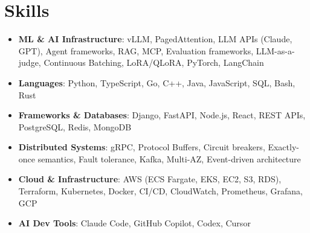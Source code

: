 \documentclass[letterpaper,11pt]{article}
\newcommand{\resumeSubHeadingListStart}{\begin{itemize}[leftmargin=0.15in, label={}]}
\newcommand{\resumeSubHeadingListEnd}{\end{itemize}}
\newcommand{\resumeSkillHeading}[2]{%
  \item\small{\textbf{#1}: #2 \vspace{-9pt}}%
}
\begin{document}
\section{Skills}
  \resumeSubHeadingListStart
    \resumeSkillHeading{ML \& AI Infrastructure}{vLLM, PagedAttention, LLM APIs (Claude, GPT), Agent frameworks, RAG, MCP, Evaluation frameworks, LLM-as-a-judge, Continuous Batching, LoRA/QLoRA, PyTorch, LangChain}
    \resumeSkillHeading{Languages}{Python, TypeScript, Go, C++, Java, JavaScript, SQL, Bash, Rust}
    \resumeSkillHeading{Frameworks \& Databases}{Django, FastAPI, Node.js, React, REST APIs, PostgreSQL, Redis, MongoDB}
    \resumeSkillHeading{Distributed Systems}{gRPC, Protocol Buffers, Circuit breakers, Exactly-once semantics, Fault tolerance, Kafka, Multi-AZ, Event-driven architecture}
    \resumeSkillHeading{Cloud \& Infrastructure}{AWS (ECS Fargate, EKS, EC2, S3, RDS), Terraform, Kubernetes, Docker, CI/CD, CloudWatch, Prometheus, Grafana, GCP}
    \resumeSkillHeading{AI Dev Tools}{Claude Code, GitHub Copilot, Codex, Cursor}
  \resumeSubHeadingListEnd
\end{document}
